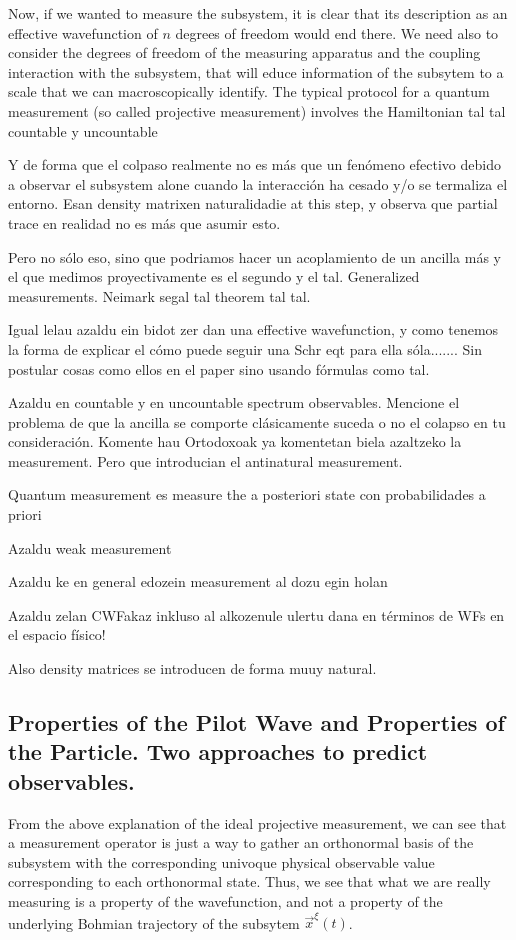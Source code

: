 \documentclass[11pt, a4paper]{article} %
\begin{document}
Now, if we wanted to measure the subsystem, it is clear that its description as an effective wavefunction of $n$ degrees of freedom would end there. We need also to consider the degrees of freedom of the measuring apparatus and the coupling interaction with the subsystem, that will educe information of the subsytem to a scale that we can macroscopically identify. The typical protocol for a quantum measurement (so called projective measurement) involves the Hamiltonian
tal tal countable y uncountable

Y de forma que el colpaso realmente no es más que un fenómeno efectivo debido a observar el subsystem alone cuando la interacción ha cesado y/o se termaliza el entorno. Esan density matrixen naturalidadie at this step, y observa que partial trace en realidad no es más que asumir esto.

Pero no sólo eso, sino que podriamos hacer un acoplamiento de un ancilla más y el que medimos proyectivamente es el segundo y el tal. Generalized measurements. Neimark segal tal theorem tal tal. 



Igual lelau azaldu ein bidot zer dan una effective wavefunction, y como tenemos la forma de explicar el cómo puede seguir una Schr eqt para ella sóla....... Sin postular cosas como ellos en el paper sino usando fórmulas como tal.

Azaldu en countable y en uncountable spectrum observables. Mencione el problema de que la ancilla se comporte clásicamente suceda o no el colapso en tu consideración. Komente hau Ortodoxoak ya komentetan biela azaltzeko la measurement. Pero que introducian el antinatural measurement.

Quantum measurement es measure the a posteriori state con probabilidades a priori

Azaldu weak measurement

Azaldu ke en general edozein measurement al dozu egin holan

Azaldu zelan CWFakaz inkluso al alkozenule ulertu  dana en términos de WFs en el espacio físico!

Also density matrices se introducen de forma muuy natural.

\subsection*{Properties of the Pilot Wave and Properties of the Particle. Two approaches to predict observables.}

From the above explanation of the ideal projective measurement, we can see that a measurement operator is just a way to gather an orthonormal basis of the subsystem with the corresponding univoque physical observable value corresponding to each orthonormal state. Thus, we see that what we are really measuring is a property of the wavefunction, and not a property of the underlying Bohmian trajectory of the subsytem $\vec{x}^\xi(t)$.
\end{document}
